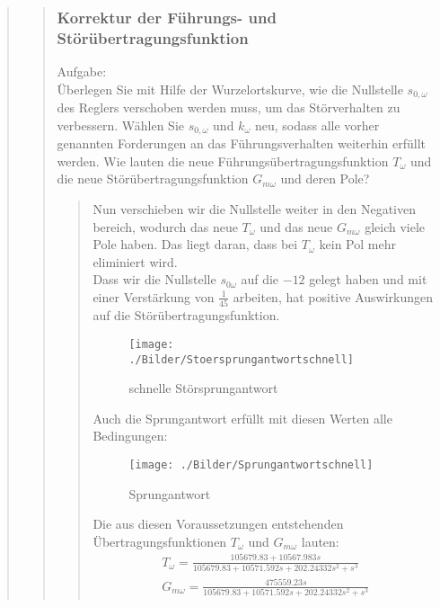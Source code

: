 \begin{quote}
\begin{quote}
		\subsubsection{Korrektur der Führungs- und Störübertragungsfunktion}
		Aufgabe:\\
	    Überlegen Sie mit Hilfe der Wurzelortskurve, wie die Nullstelle $s_{0,\omega}$ des Reglers verschoben werden muss, um
	    das Störverhalten zu verbessern. Wählen Sie $s_{0,\omega}$ und $k_\omega$ neu, sodass alle vorher genannten
	    Forderungen an das Führungsverhalten weiterhin erfüllt werden. Wie lauten die neue
	    Führungsübertragungsfunktion $T_\omega$ und die neue Störübertragungsfunktion $G_{m\omega}$ und deren Pole?
		\begin{quote}
		\vspace{1em}
			Nun verschieben wir die Nullstelle weiter in den Negativen bereich, wodurch das neue $T_\omega$ und das
			neue $G_{m\omega}$ gleich viele Pole haben. Das liegt daran, dass bei $T_\omega$ kein Pol mehr eliminiert wird.\\
			Dass wir die Nullstelle $s_{0\omega}$ auf die $-12$ gelegt haben und mit einer Verstärkung von $\frac{1}{45}$
			arbeiten, hat positive Auswirkungen auf die Störübertragungsfunktion.
			
			\begin{figure}[H]
            \centering
                \texttt{[image: ./Bilder/Stoersprungantwortschnell]}
                    \caption{schnelle Störsprungantwort}
                    \label{fig:Stoersprungantwortschnell}
            \end{figure}
            
            Auch die Sprungantwort erfüllt mit diesen Werten alle Bedingungen:
            \begin{figure}[H]
            \centering
                \texttt{[image: ./Bilder/Sprungantwortschnell]}
                    \caption{Sprungantwort}
                    \label{fig:./Bilder/Sprungantwortschnell}
            \end{figure}
    
    
            Die aus diesen Voraussetzungen entstehenden Übertragungsfunktionen $T_\omega$ und $G_{m\omega}$ lauten:
            \begin{equation*}
            	\begin{split}
            		T_\omega = \frac{105679.83 + 10567.983s}{105679.83 + 10571.592s + 202.24332s^2 + s^3}\\
            		G_{m\omega} = \frac{475559.23s}{105679.83 + 10571.592s + 202.24332s^2 + s^3}
            	\end{split}
            \end{equation*}
		\end{quote}
		

\end{quote}
\end{quote}
